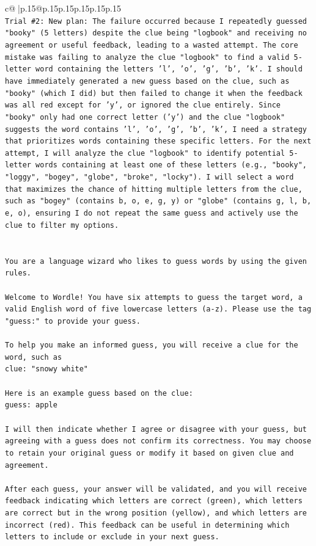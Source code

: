 \documentclass{article}
\begin{document}
{\begin{supertabular}{c@{$\;$}|p{.15\linewidth}@{}p{.15\linewidth}p{.15\linewidth}p{.15\linewidth}p{.15\linewidth}p{.15\linewidth}}
{{{\\ 
\texttt{Trial \#2: New plan: The failure occurred because I repeatedly guessed "booky" (5 letters) despite the clue being "logbook" and receiving no agreement or useful feedback, leading to a wasted attempt. The core mistake was failing to analyze the clue "logbook" to find a valid 5{-}letter word containing the letters 'l', 'o', 'g', 'b', 'k'. I should have immediately generated a new guess based on the clue, such as "booky" (which I did) but then failed to change it when the feedback was all red except for 'y', or ignored the clue entirely. Since "booky" only had one correct letter ('y') and the clue "logbook" suggests the word contains 'l', 'o', 'g', 'b', 'k', I need a strategy that prioritizes words containing these specific letters. For the next attempt, I will analyze the clue "logbook" to identify potential 5{-}letter words containing at least one of these letters (e.g., "booky", "loggy", "bogey", "globe", "broke", "locky"). I will select a word that maximizes the chance of hitting multiple letters from the clue, such as "bogey" (contains b, o, e, g, y) or "globe" (contains g, l, b, e, o), ensuring I do not repeat the same guess and actively use the clue to filter my options.} \\
\\ 
\\ 
\texttt{You are a language wizard who likes to guess words by using the given rules.} \\
\\ 
\texttt{Welcome to Wordle! You have six attempts to guess the target word, a valid English word of five lowercase letters (a{-}z). Please use the tag "guess:" to provide your guess.} \\
\\ 
\texttt{To help you make an informed guess, you will receive a clue for the word, such as} \\
\texttt{clue: "snowy white"} \\
\\ 
\texttt{Here is an example guess based on the clue: } \\
\texttt{guess: apple} \\
\\ 
\texttt{I will then indicate whether I agree or disagree with your guess, but agreeing with a guess does not confirm its correctness. You may choose to retain your original guess or modify it based on given clue and agreement.} \\
\\ 
\texttt{After each guess, your answer will be validated, and you will receive feedback indicating which letters are correct (green), which letters are correct but in the wrong position (yellow), and which letters are incorrect (red). This feedback can be useful in determining which letters to include or exclude in your next guess.} \\
}}}
\end{supertabular}}
\end{document}
